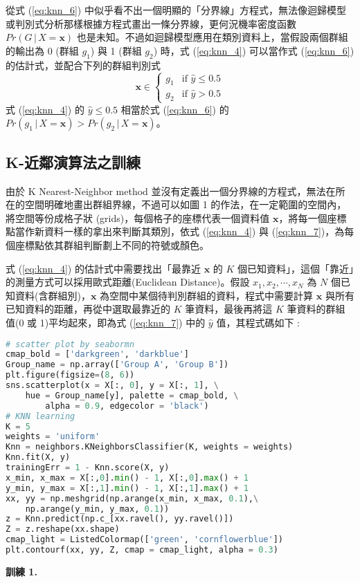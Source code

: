 \begin{tcolorbox}[title = {群組判別}]
從式 (\ref{eq:knn_6}) 中似乎看不出一個明顯的「分界線」方程式，無法像迴歸模型或判別式分析那樣根據方程式畫出一條分界線，更何況機率密度函數 $Pr(G\,|\,X = \mathbf{x})$ 也是未知。不過如迴歸模型應用在類別資料上，當假設兩個群組的輸出為 0 (群組 $g_1$) 與 1 (群組 $g_2$) 時，式 (\ref{eq:knn_4}) 可以當作式 (\ref{eq:knn_6}) 的估計式，並配合下列的群組判別式
\begin{equation}\label{eq:knn_7}
\mathbf{x} \in \begin{cases} 
g_1  & \mbox{if} \,\,\hat{y} \leq 0.5\\ 
g_2  & \mbox{if} \,\,\hat{y} > 0.5
\end{cases}
\end{equation}
式 (\ref{eq:knn_4}) 的 $\hat{y} \leq 0.5$ 相當於式 (\ref{eq:knn_6}) 的 $Pr(g_1\,|\,X = \mathbf{x}) > Pr(g_2\,|\,X = \mathbf{x})$。
\end{tcolorbox}

\subsection{K-近鄰演算法之訓練}
由於 K Nearest-Neighbor method 並沒有定義出一個分界線的方程式，無法在所在的空間明確地畫出群組界線，不過可以如圖 1 的作法，在一定範圍的空間內，將空間等份成格子狀 (grids)，每個格子的座標代表一個資料值 $\mathbf{x}$，將每一個座標點當作新資料一樣的拿出來判斷其類別，依式 (\ref{eq:knn_4}) 與 (\ref{eq:knn_7})，為每個座標點依其群組判斷劃上不同的符號或顏色。

式 (\ref{eq:knn_4}) 的估計式中需要找出「最靠近 $\mathbf{x}$ 的 $K$ 個已知資料」，這個「靠近」的測量方式可以採用歐式距離(Euclidean Distance)。假設 $x_1, x_2, \cdots, x_N$ 為 $N$ 個已知資料(含群組別)，$\mathbf{x}$ 為空間中某個待判別群組的資料，程式中需要計算 $\mathbf{x}$ 與所有已知資料的距離，再從中選取最靠近的 $K$ 筆資料，最後再將這 $K$ 筆資料的群組值(0 或 1)平均起來，即為式 (\ref{eq:knn_7}) 中的 $\hat{y}$ 值，其程式碼如下 :
\bigskip
\begin{lstlisting}[language = Python]
# scatter plot by seabormn
cmap_bold = ['darkgreen', 'darkblue']
Group_name = np.array(['Group A', 'Group B'])
plt.figure(figsize=(8, 6))
sns.scatterplot(x = X[:, 0], y = X[:, 1], \
    hue = Group_name[y], palette = cmap_bold, \
        alpha = 0.9, edgecolor = 'black')
# KNN learning
K = 5
weights = 'uniform'
Knn = neighbors.KNeighborsClassifier(K, weights = weights)
Knn.fit(X, y)
trainingErr = 1 - Knn.score(X, y)
x_min, x_max = X[:,0].min() - 1, X[:,0].max() + 1
y_min, y_max = X[:,1].min() - 1, X[:,1].max() + 1
xx, yy = np.meshgrid(np.arange(x_min, x_max, 0.1),\
	np.arange(y_min, y_max, 0.1))
z = Knn.predict(np.c_[xx.ravel(), yy.ravel()])
Z = z.reshape(xx.shape)
cmap_light = ListedColormap(['green', 'cornflowerblue'])
plt.contourf(xx, yy, Z, cmap = cmap_light, alpha = 0.3)
\end{lstlisting}
\bigskip
\textbf{\large 訓練 1.}

